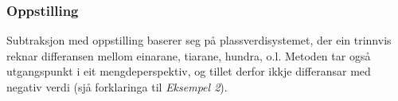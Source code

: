 \subsubsection{Oppstilling}
Subtraksjon med oppstilling baserer seg på plassverdisystemet, der ein trinnvis reknar differansen mellom einarane, tiarane, hundra, o.l. Metoden tar også utgangspunkt i eit mengdeperspektiv, og tillet derfor ikkje differansar med negativ verdi (sjå forklaringa til \textsl{Eksempel 2}).
\begin{center}
	\parbox{0.3\linewidth}{
} \qquad
\parbox{0.3\linewidth}{
} \\[12pt]
\parbox{0.3\linewidth}{
}\qquad
\parbox{0.3\linewidth}{
}

\end{center}
